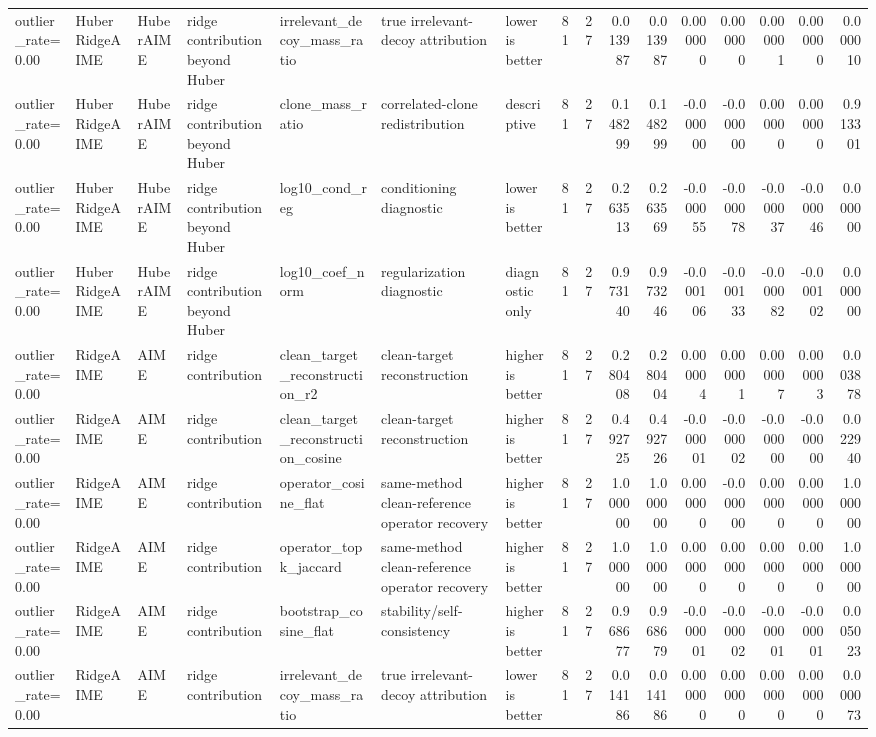 \begin{table}[t]
\begin{tabular}{lllllllrrrrrrrrr}
outlier_rate=0.00 & HuberRidgeAIME & HuberAIME & ridge contribution beyond Huber & irrelevant_decoy_mass_ratio & true irrelevant-decoy attribution & lower is better & 81 & 27 & 0.013987 & 0.013987 & 0.000000 & 0.000000 & 0.000001 & 0.000000 & 0.000010 \\
outlier_rate=0.00 & HuberRidgeAIME & HuberAIME & ridge contribution beyond Huber & clone_mass_ratio & correlated-clone redistribution & descriptive & 81 & 27 & 0.148299 & 0.148299 & -0.000000 & -0.000000 & 0.000000 & 0.000000 & 0.913301 \\
outlier_rate=0.00 & HuberRidgeAIME & HuberAIME & ridge contribution beyond Huber & log10_cond_reg & conditioning diagnostic & lower is better & 81 & 27 & 0.263513 & 0.263569 & -0.000055 & -0.000078 & -0.000037 & -0.000046 & 0.000000 \\
outlier_rate=0.00 & HuberRidgeAIME & HuberAIME & ridge contribution beyond Huber & log10_coef_norm & regularization diagnostic & diagnostic only & 81 & 27 & 0.973140 & 0.973246 & -0.000106 & -0.000133 & -0.000082 & -0.000102 & 0.000000 \\
outlier_rate=0.00 & RidgeAIME & AIME & ridge contribution & clean_target_reconstruction_r2 & clean-target reconstruction & higher is better & 81 & 27 & 0.280408 & 0.280404 & 0.000004 & 0.000001 & 0.000007 & 0.000003 & 0.003878 \\
outlier_rate=0.00 & RidgeAIME & AIME & ridge contribution & clean_target_reconstruction_cosine & clean-target reconstruction & higher is better & 81 & 27 & 0.492725 & 0.492726 & -0.000001 & -0.000002 & -0.000000 & -0.000000 & 0.022940 \\
outlier_rate=0.00 & RidgeAIME & AIME & ridge contribution & operator_cosine_flat & same-method clean-reference operator recovery & higher is better & 81 & 27 & 1.000000 & 1.000000 & 0.000000 & -0.000000 & 0.000000 & 0.000000 & 1.000000 \\
outlier_rate=0.00 & RidgeAIME & AIME & ridge contribution & operator_topk_jaccard & same-method clean-reference operator recovery & higher is better & 81 & 27 & 1.000000 & 1.000000 & 0.000000 & 0.000000 & 0.000000 & 0.000000 & 1.000000 \\
outlier_rate=0.00 & RidgeAIME & AIME & ridge contribution & bootstrap_cosine_flat & stability/self-consistency & higher is better & 81 & 27 & 0.968677 & 0.968679 & -0.000001 & -0.000002 & -0.000001 & -0.000001 & 0.005023 \\
outlier_rate=0.00 & RidgeAIME & AIME & ridge contribution & irrelevant_decoy_mass_ratio & true irrelevant-decoy attribution & lower is better & 81 & 27 & 0.014186 & 0.014186 & 0.000000 & 0.000000 & 0.000000 & 0.000000 & 0.000073 \\

\end{tabular}
\end{table}

